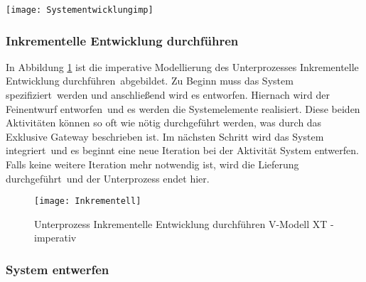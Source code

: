 \begin{sidewaysfigure}[!htbp]
\begin{center}
  \texttt{[image: Systementwicklungimp]} %
  \caption{Systementwicklungsprojekt AG/AN  V-Modell XT - imperativ}
  \label{fig:Systementwicklungimp}
\end{center}
\end{sidewaysfigure}




\subsubsection{Inkrementelle Entwicklung durchführen}
In Abbildung \ref{fig:Inkrementell} ist die imperative Modellierung des Unterprozesses \grqq Inkrementelle Entwicklung durchführen\grqq \ abgebildet. \newline
Zu Beginn muss das \grqq System spezifiziert\grqq \ werden und anschließend wird es entworfen. \newline
Hiernach wird der \grqq Feinentwurf entworfen\grqq \ und es werden die \grqq Systemelemente realisiert\grqq. Diese beiden Aktivitäten können so oft wie nötig durchgeführt werden, was durch das Exklusive Gateway beschrieben ist.  \newline
Im nächsten Schritt wird das \grqq System integriert\grqq \ und es beginnt eine neue Iteration bei der Aktivität System entwerfen.\newline
Falls keine weitere Iteration mehr notwendig ist, wird die \grqq Lieferung durchgeführt\grqq \ und der Unterprozess endet hier. \newline

\begin{figure}[!htbp]
\begin{center}
  \texttt{[image: Inkrementell]} %
  \caption{Unterprozess Inkrementelle Entwicklung durchführen V-Modell XT - imperativ}
  \label{fig:Inkrementell}
\end{center}
\end{figure}



\clearpage


\subsubsection{System entwerfen}

